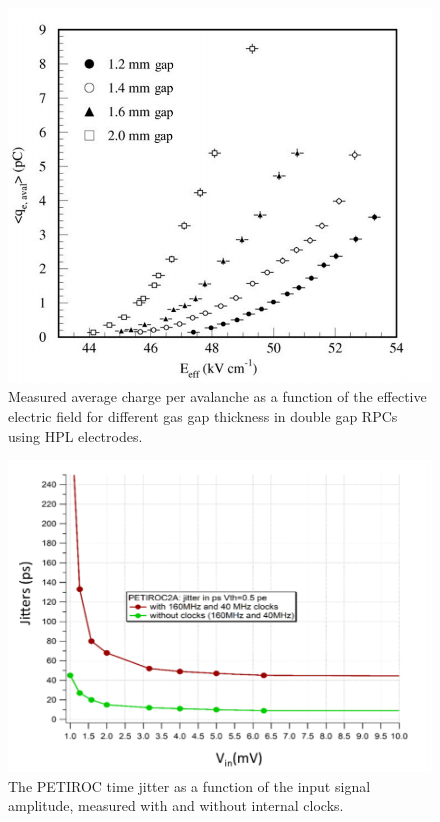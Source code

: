 	\begin{figure}[H]
		\centering
		\includegraphics[width=0.8\plotwidth]{fig/chapt3/charge-vs-gap.png}
		\caption{\label{fig:charge-gap} Measured average charge per avalanche as a function of the effective electric field for different gas gap thickness in double gap RPCs using HPL electrodes.}
	\end{figure}

	\begin{figure}[H]
		\centering
		\includegraphics[width=0.8\plotwidth]{fig/chapt3/jitter-PETIROC.png}
		\caption{\label{fig:jitter} The PETIROC time jitter as a function of the input signal amplitude, measured with and without internal clocks.}
	\end{figure}
	
